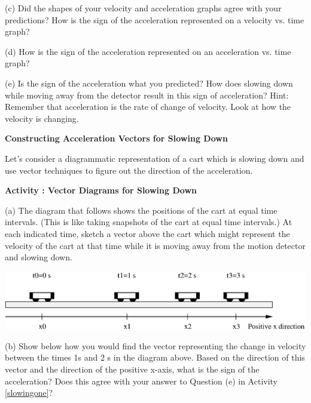 (c) Did the shapes of your velocity and acceleration graphs agree with your
predictions? How is the sign of the acceleration represented on a velocity vs.
time graph? 
\vspace{20mm}

(d) How is the sign of the acceleration represented on an acceleration vs. time
graph? 
\vspace{20mm}

\newpage

(e) Is the sign of the acceleration what you predicted? How does slowing down
while moving away from the detector result in this sign of acceleration? Hint:
Remember that acceleration is the rate of change of velocity. Look at how the
velocity is changing.
\vspace{20mm}

\textbf{Constructing Acceleration Vectors for Slowing Down }

Let's consider a diagrammatic representation of a cart which is slowing down
and use vector techniques to figure out the direction of the acceleration.

\textbf{Activity : Vector Diagrams for Slowing Down}

(a) The diagram that follows shows the positions of the cart at equal time intervals.
(This is like taking snapshots of the cart at equal time intervals.) At each
indicated time, sketch a vector above the cart which might represent the velocity
of the cart at that time while it is moving away from the motion detector and
slowing down.

\vspace{0.3cm}
{\par\centering \includegraphics{slowing/slowing_fig2.eps} \par}
\vspace{0.3cm}


(b) Show below how you would find the vector representing the change in velocity
between the times 1s and 2 s in the diagram above. Based on the direction of
this vector and the direction of the positive x-axis, what is the sign of the
acceleration? Does this agree with your answer to Question (e) in Activity \ref{slowingone}?
\vspace{20mm}

